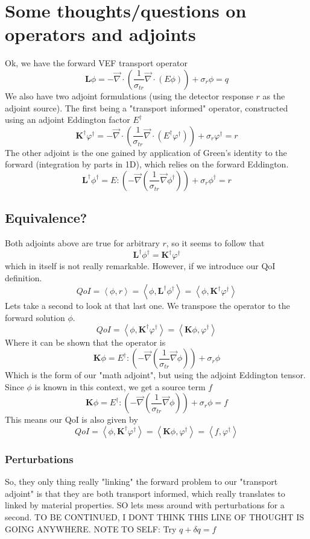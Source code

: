 \documentclass{article}
\newcommand{\bra}{\left\langle}
\newcommand{\ket}{\right\rangle}
\newcommand{\vdiv}{\vec{\nabla} \cdot}
\newcommand{\vgrad}{\vec{\nabla}}
\begin{document}
\section{Some thoughts/questions on operators and adjoints}
Ok, we have the forward VEF transport operator
\[
\mathbf{L}\phi =
-\vdiv \left( \frac{1}{\sigma_{tr}} \vdiv \left( E \phi \right) \right) + \sigma_r \phi = q
\]
We also have two adjoint formulations (using the detector response $r$ as the adjoint source). The first being a "transport informed" operator, constructed using an adjoint Eddington factor $E^\dag$
\[
\mathbf{K}^\dag\varphi^\dag = -\vdiv \left( \frac{1}{\sigma_{tr}} \vdiv \left( E^\dag \varphi^\dag \right) \right) + \sigma_r \varphi^\dag = r
\]
The other adjoint is the one gained by application of Green's identity to the forward (integration by parts in 1D), which relies on the forward Eddington.
\[ 
\mathbf{L}^\dag \phi^\dag = E : \left( - \vgrad \left( \frac{1}{\sigma_{tr}} \vgrad \phi^\dag \right) \right)
+ \sigma_r \phi^\dag
= r
\]
\subsection*{Equivalence?}
Both adjoints above are true for arbitrary $r$, so it seems to follow that
\[
\mathbf{L}^\dag \phi^\dag = \mathbf{K}^\dag\varphi^\dag 
\]
which in itself is not really remarkable. However, if we introduce our QoI definition.
\[
QoI=\bra \phi , r \ket = \bra \phi , \mathbf{L}^\dag \phi^\dag \ket = \bra \phi , \mathbf{K}^\dag\varphi^\dag \ket
\]
Lets take a second to look at that last one. We transpose the operator to the forward solution $\phi$.
\[
QoI = \bra \phi , \mathbf{K}^\dag\varphi^\dag \ket = \bra \mathbf{K} \phi , \varphi^\dag \ket
\]
Where it can be shown that the operator is
\[
\mathbf{K} \phi =  E^\dag : \left( - \vgrad \left( \frac{1}{\sigma_{tr}} \vgrad \phi \right) \right)
+ \sigma_r \phi
\]
Which is the form of our "math adjoint", but using the adjoint Eddington tensor. Since $\phi$ is known in this context, we get a source term $f$
\[
\mathbf{K} \phi =  E^\dag : \left( - \vgrad \left( \frac{1}{\sigma_{tr}} \vgrad \phi \right) \right)
+ \sigma_r \phi = f
\]
This means our QoI is also given by
\[
QoI = \bra \phi , \mathbf{K}^\dag\varphi^\dag \ket = \bra \mathbf{K} \phi , \varphi^\dag \ket = \bra f , \varphi^\dag \ket
\]
\subsubsection{Perturbations}
So, they only thing really "linking" the forward problem to our "transport adjoint" is that they are both transport informed, which really translates to linked by material properties. SO lets mess around with perturbations for a second.
TO BE CONTINUED, I DONT THINK THIS LINE OF THOUGHT IS GOING ANYWHERE. NOTE TO SELF: Try $q + \delta q = f$
\newpage
\end{document}

